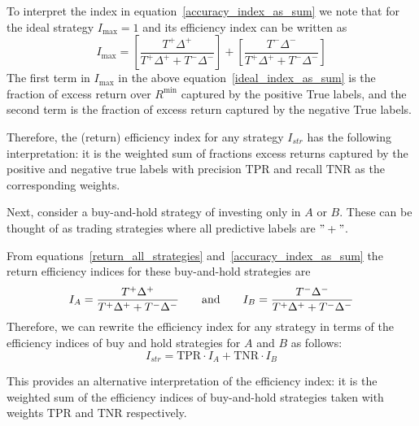 \documentclass{article}
\begin{document}
To interpret the index in equation~\eqref{accuracy_index_as_sum} we note that
for the ideal strategy $I_{\max}=1$ and its efficiency index can be written as 
\begin{equation}
I_{\max} = \left[ \frac{T^{+}\Delta^{+} }
{T^{+} \Delta^{+} + T^{-}\Delta^{-}} \right]
+ \left[ \frac{T^{-} \Delta^{-}}
{T^{+} \Delta^{+} + T^{-}\Delta^{-}}\right]
\label{ideal_index_as_sum}
\end{equation}
The first term in $I_{\max}$ in the above equation~\eqref{ideal_index_as_sum} is the fraction of excess return over $R^{\min}$ captured by the positive True labels, and the second term is the fraction of excess return captured by the negative True labels.

Therefore, the (return) efficiency index for any strategy $I_{str}$ has the following interpretation: it is the weighted sum of fractions excess returns captured by the positive and negative true labels with precision 
$\text{TPR}$ and recall $\text{TNR}$ as the corresponding weights.  

Next, consider a buy-and-hold strategy of investing only in $A$ or $B$. These can be thought of as trading strategies where all predictive labels are $"+"$.

From equations~\eqref{return_all_strategies}
and~\eqref{accuracy_index_as_sum} the 
return efficiency indices for these buy-and-hold strategies are
\begin{equation}
I_{{A}} = \frac{T^{+}\Delta^{+}}{T^{+} \Delta^{+} + T^{-}\Delta^{-}} \qquad \hbox{and} \qquad
I_{{B}} = \frac{T^{-}\Delta^{-}}{T^{+} \Delta^{+} + T^{-}\Delta^{-}}
\label{accuracy_index_benchmark}
\end{equation}
Therefore, we can rewrite the efficiency index for any strategy in terms of the efficiency indices of buy and hold strategies for $A$ and $B$ as follows:
\begin{equation}
I_{str} = \text{TPR}\cdot I_{A} + \text{TNR}\cdot I_{B}
\label{accuracy_as_benchmarks}
\end{equation}

This provides an alternative interpretation of the efficiency index: it is the weighted sum of the efficiency indices of buy-and-hold strategies taken with weights $\text{TPR}$ and $\text{TNR}$ respectively.
\end{document}
